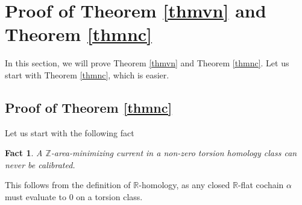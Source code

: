 \documentclass[11pt,a4paper]{amsart}
\numberwithin{equation}{section}
\newcommand{\ai}{\alpha}
\newcommand{\R}{\mathbb{R}}
\newcommand{\Z}{\mathbb{Z}}
\theoremstyle{plain}
\newtheorem{fact}{Fact}[subsection]
\theoremstyle{definition}
\numberwithin{equation}{subsection}
\begin{document}
\section{Proof of  Theorem \ref{thmvn} and Theorem \ref{thmnc}}\label{secpfs}
	In this section, we will prove Theorem \ref{thmvn} and Theorem \ref{thmnc}. Let us start with Theorem \ref{thmnc}, which is easier.
	\subsection{Proof of Theorem \ref{thmnc}}
	Let us start with the following fact
	\begin{fact}
		A $\Z$-area-minimizing current in a non-zero torsion homology class can never be calibrated. 
	\end{fact}
	This follows from the definition of $\R$-homology, as any closed $\R$-flat cochain $\ai$ must evaluate to $0$ on a torsion class.
	
\end{document}
